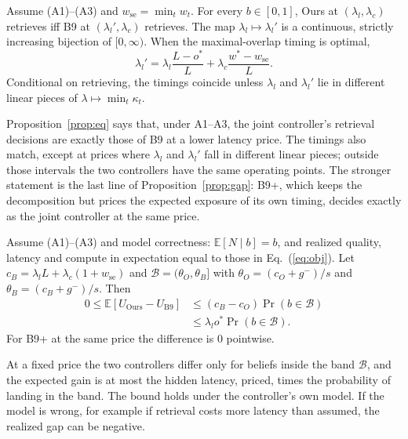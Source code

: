 \begin{proposition}[Equivalence]\label{prop:eq}
Assume (A1)--(A3) and $w_{\mathrm{se}}=\min_tw_t$. For every $b\in[0,1]$, Ours
at $(\lambda_l,\lambda_c)$ retrieves iff B9 at $(\lambda_l',\lambda_c)$
retrieves. The map $\lambda_l\mapsto\lambda_l'$ is a continuous, strictly
increasing bijection of $[0,\infty)$. When the maximal-overlap timing is optimal,
\[
\lambda_l'=\lambda_l\frac{L-o^{*}}{L}+\lambda_c\frac{w^{*}-w_{\mathrm{se}}}{L}.
\]
Conditional on retrieving, the timings coincide unless $\lambda_l$ and
$\lambda_l'$ lie in different linear pieces of $\lambda\mapsto\min_t\kappa_t$.
\end{proposition}
Proposition~\ref{prop:eq} says that, under A1--A3, the joint controller's
retrieval decisions are exactly those of B9 at a lower latency price. The
timings also match, except at prices where $\lambda_l$ and $\lambda_l'$ fall
in different linear pieces; outside those intervals the two controllers have
the same operating points. The stronger statement is the last line of
Proposition~\ref{prop:gap}: B9+, which keeps the decomposition but prices the
expected exposure of its own timing, decides exactly as the joint controller
at the same price.

\begin{proposition}\label{prop:gap}
Assume (A1)--(A3) and model correctness: $\mathbb E[N\mid b]=b$, and realized
quality, latency and compute in expectation equal to those in
Eq.~(\ref{eq:obj}). Let $c_B=\lambda_lL+\lambda_c(1+w_{\mathrm{se}})$ and
$\mathcal B=(\theta_O,\theta_B]$ with $\theta_O=(c_O+g^{-})/s$ and
$\theta_B=(c_B+g^{-})/s$. Then
\begin{align*}
0\le\mathbb E[U_{\mathrm{Ours}}-U_{\mathrm{B9}}]
&\le(c_B-c_O)\Pr(b\in\mathcal B)\\
&\le\lambda_lo^{*}\Pr(b\in\mathcal B).
\end{align*}
For B9+ at the same price the difference is $0$ pointwise.
\end{proposition}
At a fixed price the two controllers differ only for beliefs inside the band
$\mathcal B$, and the expected gain is at most the hidden latency, priced,
times the probability of landing in the band. The bound holds under the
controller's own model. If the model is wrong, for example if retrieval costs
more latency than assumed, the realized gap can be negative.

